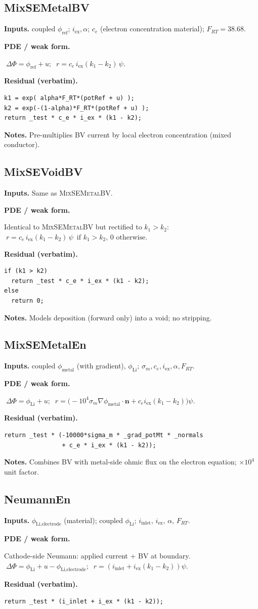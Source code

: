 \documentclass[11pt]{article}
\newcommand{\nvec}{\mathbf{n}}
\newenvironment{ecmEntry}[1]{%
  \subsection{#1}%
}{}
\newcommand{\inputsRow}[1]{\par\noindent\textbf{Inputs.} #1\par}
\newcommand{\pdeRow}[1]{\par\noindent\textbf{PDE / weak form.}\par #1\par}
\newcommand{\codeRow}{\par\noindent\textbf{Residual (verbatim).}\par}
\newcommand{\notesRow}[1]{\par\noindent\textbf{Notes.} #1\par}
\begin{document}
\begin{ecmEntry}{MixSEMetalBV}
\inputsRow{coupled $\phi_{\text{ref}}$; $i_{\text{ex}},\alpha$;
$c_e$ (electron concentration material); $F_{RT}=38.68$.}
\pdeRow{$\;\Delta\Phi = \phi_{\text{ref}} + u;\;\; r = c_e\,i_{\text{ex}}(k_1-k_2)\,\psi$.}
\codeRow\begin{lstlisting}
k1 = exp( alpha*F_RT*(potRef + u) );
k2 = exp(-(1-alpha)*F_RT*(potRef + u) );
return _test * c_e * i_ex * (k1 - k2);
\end{lstlisting}
\notesRow{Pre-multiplies BV current by local electron concentration (mixed conductor).}
\end{ecmEntry}

\begin{ecmEntry}{MixSEVoidBV}
\inputsRow{Same as \textsc{MixSEMetalBV}.}
\pdeRow{Identical to \textsc{MixSEMetalBV} but rectified to $k_1>k_2$:
$\;r = c_e\,i_{\text{ex}}(k_1-k_2)\,\psi\,\text{ if }k_1>k_2,\,0\text{ otherwise.}$}
\codeRow\begin{lstlisting}
if (k1 > k2)
  return _test * c_e * i_ex * (k1 - k2);
else
  return 0;
\end{lstlisting}
\notesRow{Models deposition (forward only) into a void; no stripping.}
\end{ecmEntry}

\begin{ecmEntry}{MixSEMetalEn}
\inputsRow{coupled $\phi_{\text{metal}}$ (with gradient), $\phi_{\text{Li}}$;
$\sigma_m,c_e,i_{\text{ex}},\alpha,F_{RT}$.}
\pdeRow{$\;\Delta\Phi = \phi_{\text{Li}}+u;\;\;
r = \bigl(-10^4\sigma_m\nabla\phi_{\text{metal}}\!\cdot\!\nvec + c_e i_{\text{ex}}(k_1-k_2)\bigr)\psi$.}
\codeRow\begin{lstlisting}
return _test * (-10000*sigma_m * _grad_potMt * _normals
                + c_e * i_ex * (k1 - k2));
\end{lstlisting}
\notesRow{Combines BV with metal-side ohmic flux on the electron equation; $\times 10^4$
unit factor.}
\end{ecmEntry}

\begin{ecmEntry}{NeumannEn}
\inputsRow{$\phi_{\text{Li,electrode}}$ (material); coupled $\phi_{\text{Li}}$;
$i_{\text{inlet}},\,i_{\text{ex}},\,\alpha,\,F_{RT}$.}
\pdeRow{Cathode-side Neumann: applied current + BV at boundary.
$\;\Delta\Phi = \phi_{\text{Li}}+u-\phi_{\text{Li,electrode}};\;\;
r = (i_{\text{inlet}} + i_{\text{ex}}(k_1-k_2))\psi$.}
\codeRow\begin{lstlisting}
return _test * (i_inlet + i_ex * (k1 - k2));
\end{lstlisting}
\end{ecmEntry}
\end{document}
